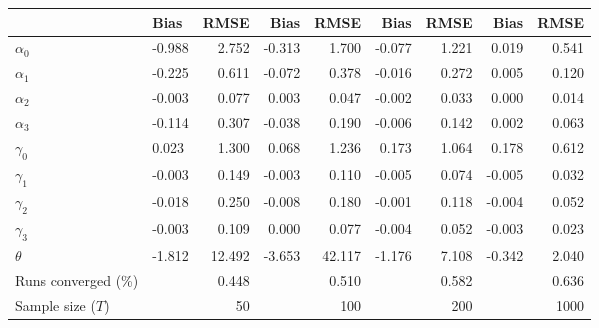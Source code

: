 
\begin{tabular}[t]{llrrrrrrr}
\toprule
  & Bias & RMSE & Bias & RMSE & Bias & RMSE & Bias & RMSE\\
\midrule
$\alpha_{0}$ & -0.988 & 2.752 & -0.313 & 1.700 & -0.077 & 1.221 & 0.019 & 0.541\\
$\alpha_{1}$ & -0.225 & 0.611 & -0.072 & 0.378 & -0.016 & 0.272 & 0.005 & 0.120\\
$\alpha_{2}$ & -0.003 & 0.077 & 0.003 & 0.047 & -0.002 & 0.033 & 0.000 & 0.014\\
$\alpha_{3}$ & -0.114 & 0.307 & -0.038 & 0.190 & -0.006 & 0.142 & 0.002 & 0.063\\
$\gamma_{0}$ & 0.023 & 1.300 & 0.068 & 1.236 & 0.173 & 1.064 & 0.178 & 0.612\\
$\gamma_{1}$ & -0.003 & 0.149 & -0.003 & 0.110 & -0.005 & 0.074 & -0.005 & 0.032\\
$\gamma_{2}$ & -0.018 & 0.250 & -0.008 & 0.180 & -0.001 & 0.118 & -0.004 & 0.052\\
$\gamma_{3}$ & -0.003 & 0.109 & 0.000 & 0.077 & -0.004 & 0.052 & -0.003 & 0.023\\
$\theta$ & -1.812 & 12.492 & -3.653 & 42.117 & -1.176 & 7.108 & -0.342 & 2.040\\
Runs converged (\%) &  & 0.448 &  & 0.510 &  & 0.582 &  & 0.636\\
Sample size ($T$) &  & 50 &  & 100 &  & 200 &  & 1000\\
\bottomrule
\end{tabular}
